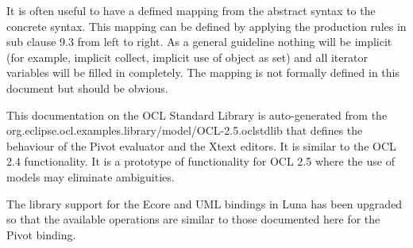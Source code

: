 \documentclass{scrreprt}   %
\begin{document}
It is often useful to have a defined mapping from the abstract syntax to the concrete syntax. This mapping can be defined
by applying the production rules in sub clause 9.3 from left to right. As a general guideline nothing will be implicit (for
example, implicit collect, implicit use of object as set) and all iterator variables will be filled in completely. The mapping
is not formally defined in this document but should be obvious.

\label{ocl:EvaluationSemantics}


This documentation on the OCL Standard Library is auto-generated from the
org.eclipse.ocl.examples.library/model/OCL-2.5.oclstdlib that defines
the behaviour of the Pivot evaluator and the Xtext editors. It is similar to the OCL 2.4 functionality.
It is a prototype of functionality for OCL 2.5 where the use of models may eliminate ambiguities.
		
The library support for the Ecore and UML bindings in Luna has been upgraded so that the available operations
are similar to those documented here for the Pivot binding.





\end{document}
